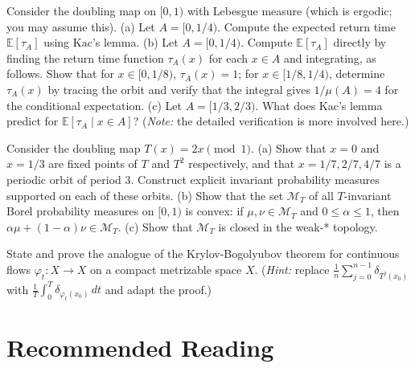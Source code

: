 \begin{exercise}
Consider the doubling map on $[0,1)$ with Lebesgue measure (which is ergodic; you may assume this).
(a) Let $A = [0, 1/4)$. Compute the expected return time $\mathbb{E}[\tau_A]$ using Kac's lemma.
(b) Let $A = [0, 1/4)$. Compute $\mathbb{E}[\tau_A]$ directly by finding the return time function $\tau_A(x)$ for each $x \in A$ and integrating, as follows. Show that for $x \in [0, 1/8)$, $\tau_A(x) = 1$; for $x \in [1/8, 1/4)$, determine $\tau_A(x)$ by tracing the orbit and verify that the integral gives $1/\mu(A) = 4$ for the conditional expectation.
(c) Let $A = [1/3, 2/3)$. What does Kac's lemma predict for $\mathbb{E}[\tau_A \mid x \in A]$? (\textit{Note:} the detailed verification is more involved here.)
\end{exercise}


\begin{exercise}
Consider the doubling map $T(x) = 2x \pmod 1$.
(a) Show that $x = 0$ and $x = 1/3$ are fixed points of $T$ and $T^2$ respectively, and that $x = 1/7, 2/7, 4/7$ is a periodic orbit of period 3. Construct explicit invariant probability measures supported on each of these orbits.
(b) Show that the set $\mathcal{M}_T$ of all $T$-invariant Borel probability measures on $[0,1)$ is convex: if $\mu, \nu \in \mathcal{M}_T$ and $0 \le \alpha \le 1$, then $\alpha \mu + (1-\alpha)\nu \in \mathcal{M}_T$.
(c) Show that $\mathcal{M}_T$ is closed in the weak-* topology.
\end{exercise}


\begin{exercise}
State and prove the analogue of the Krylov-Bogolyubov theorem for continuous flows $\varphi_t: X \to X$ on a compact metrizable space $X$. (\textit{Hint:} replace $\frac{1}{n}\sum_{j=0}^{n-1} \delta_{T^j(x_0)}$ with $\frac{1}{T}\int_0^T \delta_{\varphi_t(x_0)} \, dt$ and adapt the proof.)


\bigskip

\end{exercise}


\section*{Recommended Reading}

